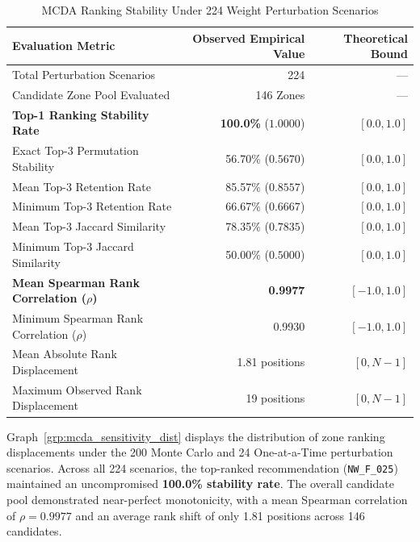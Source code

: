 \begin{table}[htbp]
\caption{MCDA Ranking Stability Under 224 Weight Perturbation Scenarios}
\label{tab:mcda_sensitivity_metrics}
\centering
\small
\begin{tabular}{lrr}
\toprule
\textbf{Evaluation Metric} & \textbf{Observed Empirical Value} & \textbf{Theoretical Bound} \\
\midrule
Total Perturbation Scenarios & 224 & --- \\
Candidate Zone Pool Evaluated & 146 Zones & --- \\
\midrule
\textbf{Top-1 Ranking Stability Rate} & \textbf{100.0\%} ($1.0000$) & $[0.0, 1.0]$ \\
Exact Top-3 Permutation Stability & 56.70\% ($0.5670$) & $[0.0, 1.0]$ \\
Mean Top-3 Retention Rate & 85.57\% ($0.8557$) & $[0.0, 1.0]$ \\
Minimum Top-3 Retention Rate & 66.67\% ($0.6667$) & $[0.0, 1.0]$ \\
Mean Top-3 Jaccard Similarity & 78.35\% ($0.7835$) & $[0.0, 1.0]$ \\
Minimum Top-3 Jaccard Similarity & 50.00\% ($0.5000$) & $[0.0, 1.0]$ \\
\midrule
\textbf{Mean Spearman Rank Correlation ($\rho$)} & \textbf{0.9977} & $[-1.0, 1.0]$ \\
Minimum Spearman Rank Correlation ($\rho$) & 0.9930 & $[-1.0, 1.0]$ \\
Mean Absolute Rank Displacement & 1.81 positions & $[0, N-1]$ \\
Maximum Observed Rank Displacement & 19 positions & $[0, N-1]$ \\
\bottomrule
\end{tabular}
\end{table}

Graph~\ref{grp:mcda_sensitivity_dist} displays the distribution of zone ranking displacements under the 200 Monte Carlo and 24 One-at-a-Time perturbation scenarios. Across all 224 scenarios, the top-ranked recommendation (\texttt{NW\_F\_025}) maintained an uncompromised \textbf{100.0\% stability rate}. The overall candidate pool demonstrated near-perfect monotonicity, with a mean Spearman correlation of $\rho = 0.9977$ and an average rank shift of only 1.81 positions across 146 candidates.

